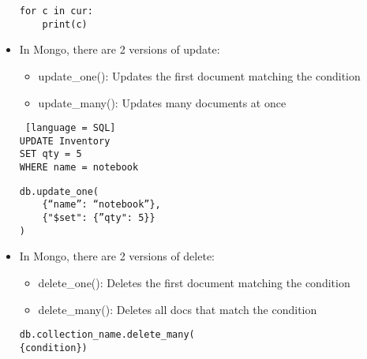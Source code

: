\documentclass[8pt,landscape,a4paper, fleqn, dvipsnames]{extarticle}
\begin{document}
\begin{multicols*}{4}
\begin{itemize}
\begin{verbatim}
for c in cur:
    print(c)
    \end{verbatim}
    \item In Mongo, there are 2 versions of update:
    \begin{itemize}
        \item update\_one(): Updates the first document matching the condition
        \item update\_many(): Updates many documents at once
    \end{itemize}
    \begin{lstlisting} [language = SQL]
UPDATE Inventory 
SET qty = 5 
WHERE name = notebook
    \end{lstlisting}
    \begin{verbatim}
db.update_one(
    {“name”: “notebook”},
    {"$set": {”qty": 5}}
)
    \end{verbatim}
    \item In Mongo, there are 2 versions of delete:
    \begin{itemize}
        \item delete\_one(): Deletes the first document matching the condition
        \item delete\_many(): Deletes all docs that match the condition
    \end{itemize}
    \begin{verbatim}
db.collection_name.delete_many(
{condition})
    \end{verbatim}
    \end{itemize}


\end{multicols*}
\end{document}
